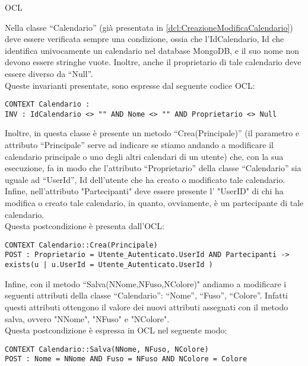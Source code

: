 \begin{listaPersonale}{OCL}
    \begin{center}
        
    \end{center}
    Nella classe “Calendario” (già presentata in \ref{dcl:CreazioneModificaCalendario}) deve essere verificata sempre una condizione, ossia che l'IdCalendario, Id che identifica univocamente un calendario nel database MongoDB, e il suo nome non devono essere stringhe vuote. Inoltre, anche il proprietario di tale calendario deve essere diverso da “Null”.\\
    Queste invarianti presentate, sono espresse dal seguente codice OCL:
    \begin{lstlisting}
CONTEXT Calendario :
INV : IdCalendario <> "" AND Nome <> "" AND Proprietario <> Null
    \end{lstlisting}
    Inoltre, in questa classe è presente un metodo “Crea(Principale)” (il parametro e attributo “Principale” serve ad indicare se stiamo andando a modificare il calendario principale o uno degli altri calendari di un utente) che, con la sua esecuzione, fa in modo che l'attributo “Proprietario” della classe “Calendario” sia uguale ad “UserId”, Id dell'utente che ha creato o modificato tale calendario. Infine, nell'attributo "Partecipanti" deve essere presente l' "UserID" di chi ha modifica o creato tale calendario, in quanto, ovviamente, è un partecipante di tale calendario. \\
    Questa postcondizione è presenta dall'OCL:
    \begin{lstlisting}
CONTEXT Calendario::Crea(Principale)
POST : Proprietario = Utente_Autenticato.UserId AND Partecipanti -> exists(u | u.UserId = Utente_Autenticato.UserId )
    \end{lstlisting}
    Infine, con il metodo “Salva(NNome,NFuso,NColore)" andiamo a modificare i seguenti attributi della classe “Calendario”: “Nome”, “Fuso”, “Colore”. Infatti questi attributi ottengono il valore dei nuovi attributi assegnati con il metodo salva, ovvero "NNome", "NFuso" e "NColore". \\
    Questa postcondizione è espressa in OCL nel seguente modo:
    \begin{lstlisting}
CONTEXT Calendario::Salva(NNome, NFuso, NColore)
POST : Nome = NNome AND Fuso = NFuso AND NColore = Colore
    \end{lstlisting}
    \newpage




\end{listaPersonale}
